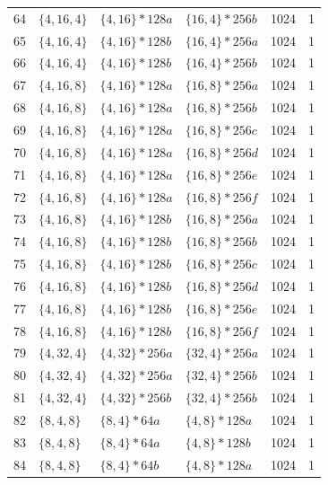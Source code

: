 \begin{longtable}{rllllr}
64 & \(\{4,16,4\}\) & \(\{4,16\}\!\ast 128a\) & \(\{16,4\}\!\ast 256b\) & 1024 & 1 \\
65 & \(\{4,16,4\}\) & \(\{4,16\}\!\ast 128b\) & \(\{16,4\}\!\ast 256a\) & 1024 & 1 \\
66 & \(\{4,16,4\}\) & \(\{4,16\}\!\ast 128b\) & \(\{16,4\}\!\ast 256b\) & 1024 & 1 \\
67 & \(\{4,16,8\}\) & \(\{4,16\}\!\ast 128a\) & \(\{16,8\}\!\ast 256a\) & 1024 & 1 \\
68 & \(\{4,16,8\}\) & \(\{4,16\}\!\ast 128a\) & \(\{16,8\}\!\ast 256b\) & 1024 & 1 \\
69 & \(\{4,16,8\}\) & \(\{4,16\}\!\ast 128a\) & \(\{16,8\}\!\ast 256c\) & 1024 & 1 \\
70 & \(\{4,16,8\}\) & \(\{4,16\}\!\ast 128a\) & \(\{16,8\}\!\ast 256d\) & 1024 & 1 \\
71 & \(\{4,16,8\}\) & \(\{4,16\}\!\ast 128a\) & \(\{16,8\}\!\ast 256e\) & 1024 & 1 \\
72 & \(\{4,16,8\}\) & \(\{4,16\}\!\ast 128a\) & \(\{16,8\}\!\ast 256f\) & 1024 & 1 \\
73 & \(\{4,16,8\}\) & \(\{4,16\}\!\ast 128b\) & \(\{16,8\}\!\ast 256a\) & 1024 & 1 \\
74 & \(\{4,16,8\}\) & \(\{4,16\}\!\ast 128b\) & \(\{16,8\}\!\ast 256b\) & 1024 & 1 \\
75 & \(\{4,16,8\}\) & \(\{4,16\}\!\ast 128b\) & \(\{16,8\}\!\ast 256c\) & 1024 & 1 \\
76 & \(\{4,16,8\}\) & \(\{4,16\}\!\ast 128b\) & \(\{16,8\}\!\ast 256d\) & 1024 & 1 \\
77 & \(\{4,16,8\}\) & \(\{4,16\}\!\ast 128b\) & \(\{16,8\}\!\ast 256e\) & 1024 & 1 \\
78 & \(\{4,16,8\}\) & \(\{4,16\}\!\ast 128b\) & \(\{16,8\}\!\ast 256f\) & 1024 & 1 \\
79 & \(\{4,32,4\}\) & \(\{4,32\}\!\ast 256a\) & \(\{32,4\}\!\ast 256a\) & 1024 & 1 \\
80 & \(\{4,32,4\}\) & \(\{4,32\}\!\ast 256a\) & \(\{32,4\}\!\ast 256b\) & 1024 & 1 \\
81 & \(\{4,32,4\}\) & \(\{4,32\}\!\ast 256b\) & \(\{32,4\}\!\ast 256b\) & 1024 & 1 \\
82 & \(\{8,4,8\}\) & \(\{8,4\}\!\ast 64a\) & \(\{4,8\}\!\ast 128a\) & 1024 & 1 \\
83 & \(\{8,4,8\}\) & \(\{8,4\}\!\ast 64a\) & \(\{4,8\}\!\ast 128b\) & 1024 & 1 \\
84 & \(\{8,4,8\}\) & \(\{8,4\}\!\ast 64b\) & \(\{4,8\}\!\ast 128a\) & 1024 & 1 \\

\end{longtable}
